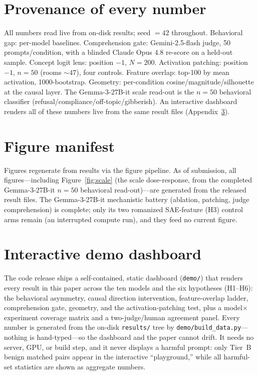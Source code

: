 \documentclass[11pt]{article}
\begin{document}
\section{Provenance of every number}
All numbers read live from on-disk results; seed $= 42$ throughout. Behavioral gap: per-model baselines. Comprehension gate: Gemini-2.5-flash judge, 50 prompts/condition, with a blinded Claude Opus 4.8 re-score on a held-out sample. Concept logit lens: position $-1$, $N{=}200$. Activation patching: position $-1$, $n{=}50$ (rooms ${\sim}47$), four controls. Feature overlap: top-100 by mean activation, 1000-bootstrap. Geometry: per-condition cosine/magnitude/silhouette at the causal layer. The Gemma-3-27B-it scale read-out is the $n{=}50$ behavioral classifier (refusal/compliance/off-topic/gibberish). An interactive dashboard renders all of these numbers live from the same result files (Appendix~\ref{app:demo}).

\section{Figure manifest}
Figures regenerate from results via the figure pipeline. As of submission, all figures---including Figure~\ref{fig:scale} (the scale dose-response, from the completed Gemma-3-27B-it $n{=}50$ behavioral read-out)---are generated from the released result files. The Gemma-3-27B-it mechanistic battery (ablation, patching, judge comprehension) is complete; only its two romanized SAE-feature (H3) control arms remain (an interrupted compute run), and they feed no current figure.

\section{Interactive demo dashboard}
\label{app:demo}
The code release ships a self-contained, static dashboard (\texttt{demo/}) that renders every result in this paper across the ten models and the six hypotheses (H1--H6): the behavioral asymmetry, causal direction intervention, feature-overlap ladder, comprehension gate, geometry, and the activation-patching test, plus a model$\times$experiment coverage matrix and a two-judge/human agreement panel. Every number is generated from the on-disk \texttt{results/} tree by \texttt{demo/build\_data.py}---nothing is hand-typed---so the dashboard and the paper cannot drift. It needs no server, GPU, or build step, and it never displays a harmful prompt: only Tier~B benign matched pairs appear in the interactive ``playground,'' while all harmful-set statistics are shown as aggregate numbers.
\end{document}
